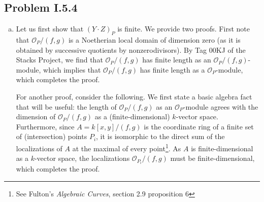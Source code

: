 \documentclass{mathnotes}
\begin{document}
\subsection*{Problem I.5.4}
\begin{enumerate}[(a)]
    \item Let us first show that $(Y\cdot Z)_P$ is finite. We provide two proofs. First note that $\mathcal{O}_P/(f,g)$
        is a Noetherian local domain of dimension zero (as it is obtained by successive quotients by nonzerodivisors).
        By Tag 00KJ of the Stacks Project, we find that $\mathcal{O}_P/(f,g)$ has finite length as an $\mathcal{O}_P/(f,g)$-module,
        which implies that $\mathcal{O}_P/(f,g)$ has finite length as a $\mathcal{O}_P$-module, which completes the proof.

        For another proof, consider the following. We first state a basic algebra fact that will be useful: the length
        of $\mathcal{O}_P/(f,g)$ as an $\mathcal{O}_P$-module agrees with the dimension of $\mathcal{O}_P/(f,g)$ as a
        (finite-dimensional) $k$-vector space. Furthermore, since $A=k[x,y]/(f,g)$ is the coordinate ring
        of a finite set of (intersection) points $P_i$, it is isomorphic to the direct sum of the localizations of $A$ at the maximal
        of every point\footnote{See Fulton's \textit{Algebraic Curves}, section 2.9 proposition 6}.
        As $A$ is finite-dimensional as a $k$-vector space, the localizations $\mathcal{O}_{P_i}/(f,g)$ must be finite-dimensional,
        which completes the proof.


\end{enumerate}
\end{document}
